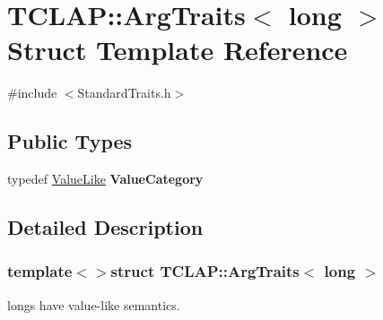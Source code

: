 \hypertarget{struct_t_c_l_a_p_1_1_arg_traits_3_01long_01_4}{\section{T\-C\-L\-A\-P\-:\-:Arg\-Traits$<$ long $>$ Struct Template Reference}
\label{struct_t_c_l_a_p_1_1_arg_traits_3_01long_01_4}
}


{\ttfamily \#include $<$Standard\-Traits.\-h$>$}

\subsection*{Public Types}
\begin{DoxyCompactItemize}
\item 
\hypertarget{struct_t_c_l_a_p_1_1_arg_traits_3_01long_01_4_a942d9a1e813bc3f82b51a2dcedb7316d}{typedef \hyperlink{struct_t_c_l_a_p_1_1_value_like}{Value\-Like} {\bfseries Value\-Category}}\label{struct_t_c_l_a_p_1_1_arg_traits_3_01long_01_4_a942d9a1e813bc3f82b51a2dcedb7316d}

\end{DoxyCompactItemize}


\subsection{Detailed Description}
\subsubsection*{template$<$$>$struct T\-C\-L\-A\-P\-::\-Arg\-Traits$<$ long $>$}

longs have value-\/like semantics. 